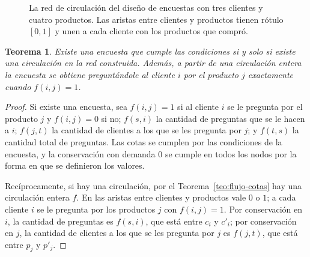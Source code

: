 \documentclass[12pt, spanish, oneside, openany]{book}
\theoremstyle{uprightplain}
\newtheorem{teorema}{Teorema}[section]
\theoremstyle{definition}
\theoremstyle{remark}
\theoremstyle{definition}
\begin{document}
\begin{figure}[H]
\centering
{}
\caption{La red de circulación del diseño de encuestas con tres clientes y cuatro
productos. Las aristas entre clientes y productos tienen rótulo $[0,1]$ y unen
a cada cliente con los productos que compró.}
\label{fig:flujo-encuestas}
\end{figure}

\begin{teorema}
\label{teo:flujo-encuestas}
Existe una encuesta que cumple las condiciones si y solo si existe una circulación en la red construida. Además, a partir de una circulación entera la encuesta se obtiene preguntándole al cliente $i$ por el producto $j$ exactamente cuando $f(i,j)=1$.
\end{teorema}
\begin{proof}
Si existe una encuesta, sea $f(i,j)=1$ si al cliente $i$ se le pregunta por el producto $j$ y $f(i,j)=0$ si no; $f(s,i)$ la cantidad de preguntas que se le hacen a $i$; $f(j,t)$ la cantidad de clientes a los que se les pregunta por $j$; y $f(t,s)$ la cantidad total de preguntas. Las cotas se cumplen por las condiciones de la encuesta, y la conservación con demanda $0$ se cumple en todos los nodos por la forma en que se definieron los valores.

Recíprocamente, si hay una circulación, por el Teorema~\ref{teo:flujo-cotas} hay una circulación entera $f$. En las aristas entre clientes y productos vale $0$ o $1$; a cada cliente $i$ se le pregunta por los productos $j$ con $f(i,j)=1$. Por conservación en $i$, la cantidad de preguntas es $f(s,i)$, que está entre $c_i$ y $c'_i$; por conservación en $j$, la cantidad de clientes a los que se les pregunta por $j$ es $f(j,t)$, que está entre $p_j$ y $p'_j$.
\end{proof}
\end{document}
